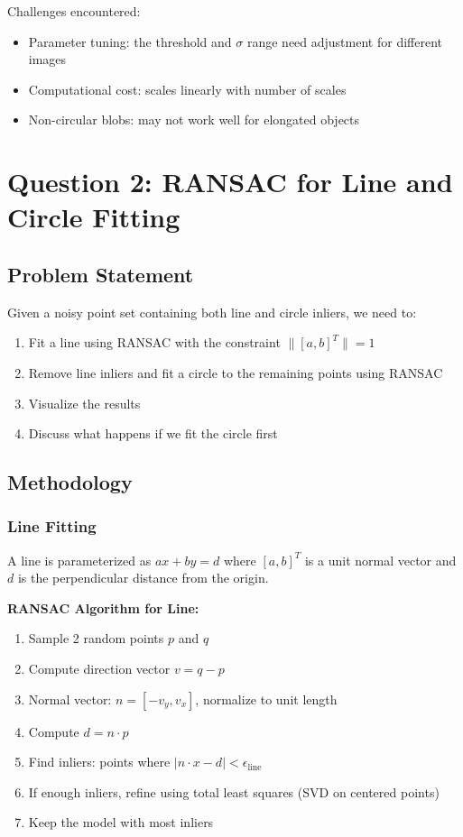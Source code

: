 \documentclass[11pt,a4paper]{article}
\begin{document}
Challenges encountered:
\begin{itemize}
    \item Parameter tuning: the threshold and $\sigma$ range need adjustment for different images
    \item Computational cost: scales linearly with number of scales
    \item Non-circular blobs: may not work well for elongated objects
\end{itemize}

\section{Question 2: RANSAC for Line and Circle Fitting}

\subsection{Problem Statement}
Given a noisy point set containing both line and circle inliers, we need to:
\begin{enumerate}
    \item Fit a line using RANSAC with the constraint $\|[a,b]^T\| = 1$
    \item Remove line inliers and fit a circle to the remaining points using RANSAC
    \item Visualize the results
    \item Discuss what happens if we fit the circle first
\end{enumerate}

\subsection{Methodology}

\subsubsection{Line Fitting}
A line is parameterized as $ax + by = d$ where $[a, b]^T$ is a unit normal vector and $d$ is the perpendicular distance from the origin.

\textbf{RANSAC Algorithm for Line:}
\begin{enumerate}
    \item Sample 2 random points $p$ and $q$
    \item Compute direction vector $v = q - p$
    \item Normal vector: $n = [-v_y, v_x]$, normalize to unit length
    \item Compute $d = n \cdot p$
    \item Find inliers: points where $|n \cdot x - d| < \epsilon_{\text{line}}$
    \item If enough inliers, refine using total least squares (SVD on centered points)
    \item Keep the model with most inliers
\end{enumerate}
\end{document}
